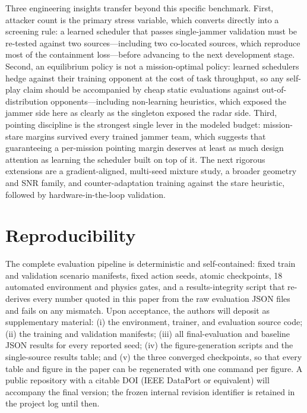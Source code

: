 Three engineering insights transfer beyond this specific benchmark. First, attacker count is the primary stress variable, which converts directly into a screening rule: a learned scheduler that passes single-jammer validation must be re-tested against two sources---including two co-located sources, which reproduce most of the containment loss---before advancing to the next development stage. Second, an equilibrium policy is not a mission-optimal policy: learned schedulers hedge against their training opponent at the cost of task throughput, so any self-play claim should be accompanied by cheap static evaluations against out-of-distribution opponents---including non-learning heuristics, which exposed the jammer side here as clearly as the singleton exposed the radar side. Third, pointing discipline is the strongest single lever in the modeled budget: mission-stare margins survived every trained jammer team, which suggests that guaranteeing a per-mission pointing margin deserves at least as much design attention as learning the scheduler built on top of it. The next rigorous extensions are a gradient-aligned, multi-seed mixture study, a broader geometry and SNR family, and counter-adaptation training against the stare heuristic, followed by hardware-in-the-loop validation.

\section*{Reproducibility}
The complete evaluation pipeline is deterministic and self-contained: fixed train and validation scenario manifests, fixed action seeds, atomic checkpoints, 18 automated environment and physics gates, and a results-integrity script that re-derives every number quoted in this paper from the raw evaluation JSON files and fails on any mismatch. Upon acceptance, the authors will deposit as supplementary material: (i) the environment, trainer, and evaluation source code; (ii) the training and validation manifests; (iii) all final-evaluation and baseline JSON results for every reported seed; (iv) the figure-generation scripts and the single-source results table; and (v) the three converged checkpoints, so that every table and figure in the paper can be regenerated with one command per figure. A public repository with a citable DOI (IEEE DataPort or equivalent) will accompany the final version; the frozen internal revision identifier is retained in the project log until then.
